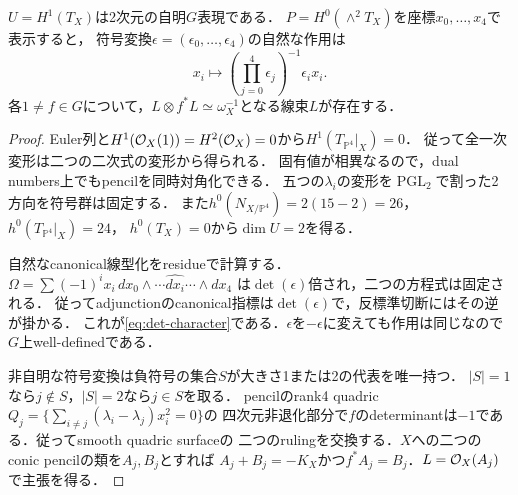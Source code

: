 \begin{lemma}[符号群の表現と二乗根]\label{lem:degree4-action}
$U=H^1(T_X)$は2次元の自明$G$表現である．
$P=H^0(\wedge^2T_X)$を座標$x_0,\ldots,x_4$で表示すると，
符号変換$\epsilon=(\epsilon_0,\ldots,\epsilon_4)$の自然な作用は
\begin{equation}\label{eq:det-character}
 x_i\longmapsto\left(\prod_{j=0}^4\epsilon_j\right)^{-1}\epsilon_i x_i.
\end{equation}
各$1\ne f\in G$について，$L\otimes f^*L\simeq\omega_X^{-1}$となる線束$L$が存在する．
\end{lemma}
\begin{proof}
Euler列と$H^1(\mathcal O_X(1))=H^2(\mathcal O_X)=0$から$H^1(T_{\mathbb P^4}|_X)=0$．
従って全一次変形は二つの二次式の変形から得られる．
固有値が相異なるので，dual numbers上でもpencilを同時対角化できる．
五つの$\lambda_i$の変形を$\operatorname{PGL}_2$で割った2方向を符号群は固定する．
また$h^0(N_{X/\mathbb P^4})=2(15-2)=26$，$h^0(T_{\mathbb P^4}|_X)=24$，
$h^0(T_X)=0$から$\dim U=2$を得る．

自然なcanonical線型化をresidueで計算する．$\Omega=\sum(-1)^i x_i\,dx_0\wedge\cdots\widehat{dx_i}\cdots\wedge dx_4$
は$\det(\epsilon)$倍され，二つの方程式は固定される．
従ってadjunctionのcanonical指標は$\det(\epsilon)$で，反標準切断にはその逆が掛かる．
これが\eqref{eq:det-character}である．$\epsilon$を$-\epsilon$に変えても作用は同じなので$G$上well-definedである．

非自明な符号変換は負符号の集合$S$が大きさ1または2の代表を唯一持つ．
$|S|=1$なら$j\notin S$，$|S|=2$なら$j\in S$を取る．
pencilのrank4 quadric $Q_j=\{\sum_{i\ne j}(\lambda_i-\lambda_j)x_i^2=0\}$の
四次元非退化部分で$f$のdeterminantは$-1$である．従ってsmooth quadric surfaceの
二つのrulingを交換する．$X$への二つのconic pencilの類を$A_j,B_j$とすれば
$A_j+B_j=-K_X$かつ$f^*A_j=B_j$．$L=\mathcal O_X(A_j)$で主張を得る．
\end{proof}

